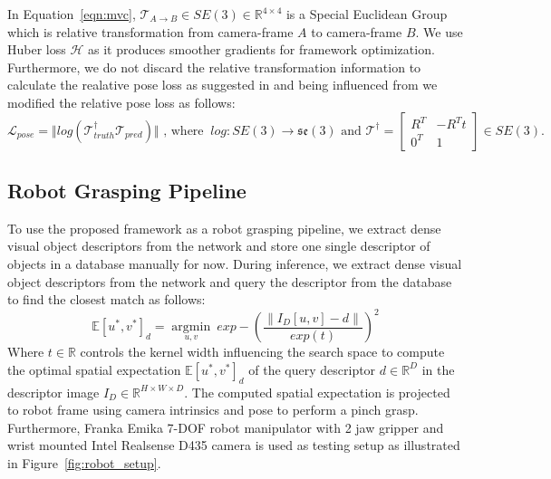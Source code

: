 In Equation~\ref{eqn:mvc}, $ \mathcal{T}_{A \rightarrow B} \in SE(3) \in \mathbb{R}^{4 \times 4}$ is a Special Euclidean Group~\cite{thurston2014three} which
is relative transformation from camera-frame $A$ to camera-frame $B$. We use Huber loss $\mathcal{H}$ as it produces smoother gradients for framework optimization.
Furthermore, we do not discard the relative transformation information to calculate the realative pose loss as suggested in \cite{suwajanakorn2018discovery}
and being influenced from \cite{zhao2020learning} we modified the relative pose loss as follows:
\begin{equation}
    \mathcal{L}_{pose} = \Vert log(\mathcal{T}_{truth}^{\dagger} \mathcal{T}_{pred}) \Vert \text{ , where  } \ log: SE(3) \rightarrow \mathfrak{se}(3) \text{ and } \mathcal{T}^{\dagger} = \begin{bmatrix}
        R^T & -R^T t \\
        0^T & 1
    \end{bmatrix} \in SE(3).
\end{equation}


\subsection{Robot Grasping Pipeline}
To use the proposed framework as a robot grasping pipeline, we extract dense visual object descriptors from the network and store
one single descriptor of objects in a database manually for now. During inference, we extract dense visual object descriptors from the network and
query the descriptor from the database to find the closest match as follows:
\begin{equation}
    \label{eqn:gaussian_kernel}
    \mathbb{E}{[u^*, v^*]_{d}} = \operatorname*{argmin}_{u, v} \ exp-\left(\dfrac{\|I_D[u, v] - d\|}{exp(t)}\right)^2
\end{equation}
Where $t \in \mathbb{R}$ controls the kernel width influencing the search space to compute the optimal spatial expectation $\mathbb{E}{[u^*, v^*]_{d}}$ of
the query descriptor $d \in \mathbb{R}^D$ in the descriptor image $I_D \in \mathbb{R}^{H \times W \times D}$. The computed spatial expectation is projected to robot frame using camera intrinsics and pose to perform a pinch grasp.
Furthermore, Franka Emika 7-DOF robot manipulator with 2 jaw gripper and wrist mounted Intel Realsense D435 camera is used as testing setup as illustrated in Figure~\ref{fig:robot_setup}.

